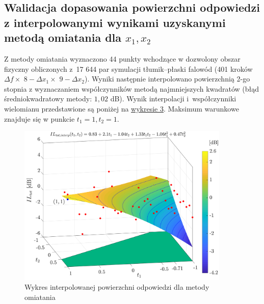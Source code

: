 \documentclass{sprawozdanie-agh}
\begin{document}
\subsection{Walidacja dopasowania powierzchni odpowiedzi z interpolowanymi wynikami uzyskanymi metodą omiatania dla $x_1,x_2$}
\par Z metody omiatania wyznaczono 44 punkty wchodzące w dozwolony obszar fizyczny obliczonych z~17 644 par symulacji tłumik--płaski falowód (401 kroków $\Delta f \times$ $8-\Delta x_1\times$ $9-\Delta x_2$). Wyniki następnie interpolowano powierzchnią 2-go stopnia z wyznaczaniem współczynników metodą najmniejszych kwadratów (błąd średniokwadratowy metody: $1,02$ dB). Wynik interpolacji i~współczynniki wielomianu przedstawione są poniżej na \hyperref[wykres3]{wykresie 3}. Maksimum warunkowe znajduje się w punkcie $t_1=1,t_2=1$.
\begin{figure}[htbp!]
    \centering
    \includegraphics[width=0.9\textwidth]{surf_interp.png}
    \caption{Wykres interpolowanej powierzchni odpowiedzi dla metody omiatania}
    \label{wykres3}
\end{figure}
\vspace{-0.8cm}
\end{document}
